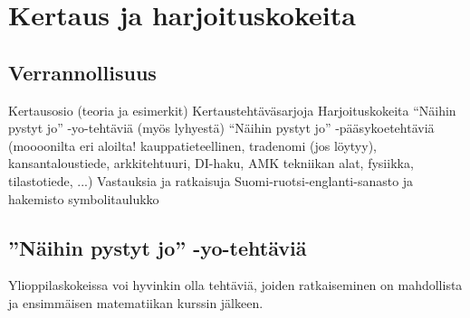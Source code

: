 %
\part{Kertaus ja harjoituskokeita}
\chapter{Verrannollisuus}

    Kertausosio (teoria ja esimerkit)
    Kertaustehtäväsarjoja
    Harjoituskokeita
    “Näihin pystyt jo” -yo-tehtäviä (myös lyhyestä)
    “Näihin pystyt jo” -pääsykoetehtäviä (moooonilta eri     aloilta! kauppatieteellinen, tradenomi (jos löytyy), kansantaloustiede, arkkitehtuuri, DI-haku, AMK tekniikan alat, fysiikka, tilastotiede, ...)
    Vastauksia ja ratkaisuja
    Suomi-ruotsi-englanti-sanasto ja hakemisto
    symbolitaulukko

\chapter{''Näihin pystyt jo'' -yo-tehtäviä}

Ylioppilaskokeissa voi hyvinkin olla tehtäviä, joiden ratkaiseminen on mahdollista ja ensimmäisen matematiikan kurssin jälkeen.

